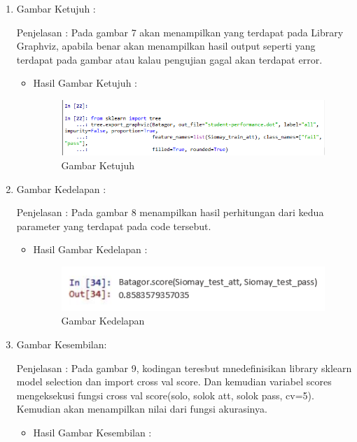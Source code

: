 \begin{itemize}
\begin{enumerate}
\begin{itemize}
\end{itemize}
\item  Gambar Ketujuh :
\par Penjelasan : Pada gambar 7 akan menampilkan yang terdapat pada Library Graphviz, apabila benar akan menampilkan hasil output seperti yang terdapat pada gambar atau kalau pengujian gagal akan terdapat error.
\par 
\begin{itemize}
\par
\item Hasil  Gambar Ketujuh :

\begin{figure}[ht]
\centering
\includegraphics[scale=0.6]{figures/AIP/jd7.PNG}
\caption{ Gambar Ketujuh}
\label{7}
\end{figure}


\end{itemize}
\item  Gambar Kedelapan :
\par Penjelasan : Pada gambar 8 menampilkan hasil perhitungan dari kedua parameter yang terdapat pada code tersebut.
\par 
\begin{itemize}
\par
\item Hasil  Gambar Kedelapan :

\begin{figure}[ht]
\centering
\includegraphics[scale=0.8]{figures/AIP/jd8.PNG}
\caption{ Gambar Kedelapan}
\label{8}
\end{figure}


\end{itemize}
\item  Gambar Kesembilan:
\par Penjelasan : Pada gambar 9, kodingan teresbut mnedefinisikan library sklearn model selection dan import cross val score. Dan kemudian variabel scores mengeksekusi fungsi cross val score(solo, solok att, solok pass, cv=5). Kemudian akan menampilkan nilai dari fungsi akurasinya.
\par 
\begin{itemize}
\par
\item Hasil  Gambar Kesembilan :


\end{itemize}
\end{enumerate}
\end{itemize}
